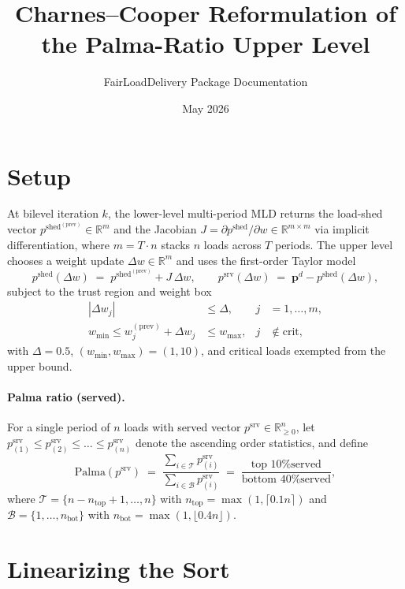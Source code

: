 \documentclass[11pt]{article}
\title{Charnes--Cooper Reformulation of the Palma-Ratio Upper Level}
\author{FairLoadDelivery Package Documentation}
\date{May 2026}
\newcommand{\pshed}{p^{\mathrm{shed}}}
\newcommand{\pserved}{p^{\mathrm{srv}}}
\newcommand{\pprev}{\pshed^{(\mathrm{prev})}}
\newcommand{\wprev}{w^{(\mathrm{prev})}}
\newcommand{\Top}{\mathcal{T}}
\newcommand{\Bot}{\mathcal{B}}
\begin{document}
\maketitle

\section{Setup}

At bilevel iteration $k$, the lower-level multi-period MLD returns the load-shed
vector $\pprev \in \mathbb{R}^{m}$ and the Jacobian
$J = \partial \pshed / \partial w \in \mathbb{R}^{m\times m}$ via implicit
differentiation, where $m = T \cdot n$ stacks $n$ loads across $T$ periods. The
upper level chooses a weight update $\Delta w \in \mathbb{R}^{m}$ and uses the
first-order Taylor model
\begin{equation}\label{eq:taylor}
    \pshed(\Delta w) \;=\; \pprev + J\,\Delta w,
    \qquad
    \pserved(\Delta w) \;=\; \bm{p}^{d} - \pshed(\Delta w),
\end{equation}
subject to the trust region and weight box
\begin{align}
    |\Delta w_j| &\le \Delta, & j &= 1,\dots,m, \label{eq:trust}\\
    w_{\min} \le \wprev_j + \Delta w_j &\le w_{\max}, & j &\notin \mathrm{crit},\label{eq:wbox}
\end{align}
with $\Delta = 0.5$, $(w_{\min}, w_{\max}) = (1, 10)$, and critical loads
exempted from the upper bound.

\paragraph{Palma ratio (served).}
For a single period of $n$ loads with served vector $\pserved \in \mathbb{R}^{n}_{\ge 0}$,
let $\pserved_{(1)} \le \pserved_{(2)} \le \dots \le \pserved_{(n)}$ denote the
ascending order statistics, and define
\begin{equation}\label{eq:palma}
    \mathrm{Palma}(\pserved) \;=\;
    \frac{\sum_{i \in \Top} \pserved_{(i)}}{\sum_{i \in \Bot} \pserved_{(i)}}
    \;=\;
    \frac{\text{top 10\% served}}{\text{bottom 40\% served}},
\end{equation}
where $\Top = \{n - n_{\mathrm{top}}+1, \dots, n\}$ with $n_{\mathrm{top}} = \max(1,\lceil 0.1 n\rceil)$
and $\Bot = \{1,\dots, n_{\mathrm{bot}}\}$ with $n_{\mathrm{bot}} = \max(1,\lfloor 0.4 n\rfloor)$.

\section{Linearizing the Sort}\label{sec:sort}
\end{document}
